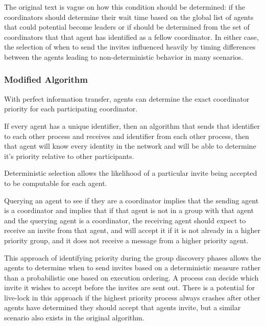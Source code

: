 The original text is vague on how this condition should be determined: if the coordinators should determine their wait time based on the global list of agents that could potential become leaders or if should be determined from the set of coordinators that that agent has identified as a fellow coordinator. In either case, the selection of when to send the invites influenced heavily by timing differences between the agents leading to non-deterministic behavior in many scenarios.

\subsubsection{Modified Algorithm}

\begin{thm}
With perfect information transfer, agents can determine the exact coordinator priority for each participating coordinator.
\end{thm}

If every agent has a unique identifier, then an algorithm that sends that identifier to each other process and receives and identifier from each other process, then that agent will know every identity in the network and will be able to determine it's priority relative to other participants.

\begin{thm}
Deterministic selection allows the likelihood of a particular invite being accepted to be computable for each agent.
\end{thm}

Querying an agent to see if they are a coordinator implies that the sending agent is a coordinator and implies that if that agent is not in a group with that agent and the querying agent is a coordinator, the receiving agent should expect to receive an invite from that agent, and will accept it if it is not already in a higher priority group, and it does not receive a message from a higher priority agent.

This approach of identifying priority during the group discovery phases allows the agents to determine when to send invites based on a deterministic measure rather than a probabilistic one based on execution ordering. A process can decide which invite it wishes to accept before the invites are sent out. There is a potential for live-lock in this approach if the highest priority process always crashes after other agents have determined they should accept that agents invite, but a similar scenario also exists in the original algorithm.

